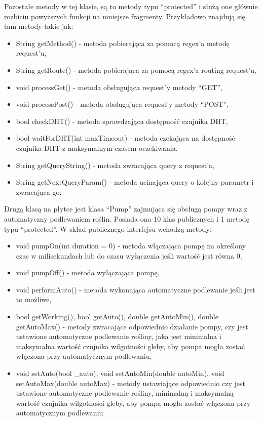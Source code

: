 \documentclass[a4paper,twoside,12pt]{book}
\begin{document}
Pozostałe metody w tej klasie, są to metody typu ``protected'' i służą one głównie rozbiciu powyższych funkcji na mniejsze fragmenty. Przykładowo znajdują się tam metody takie jak:

\begin{itemize}
   \item String getMethod() - metoda pobierająca za pomocą regex'a metodę request'u,
   \item String getRoute() - metoda pobierająca za pomocą regex'a routing request'u,
   \item void processGet() - metoda obsługująca request'y metody ``GET'',
   \item void processPost() - metoda obsługująca request'y metody ``POST'',
   \item bool checkDHT() - metoda sprawdzająca dostępność czujnika DHT,
   \item bool waitForDHT(int maxTimeout) - metoda czekająca na dostępność czujnika DHT z maksymalnym czasem oczekiwania.
   \item String getQueryString() - metoda zwracająca query z request'a,
   \item String getNextQueryParam() - metoda ucinająca query o kolejny parametr i zwracająca go.
\end{itemize}

Drugą klasą na płytce jest klasa ``Pump'' zajmująca się obsługą pompy wraz z automatyczny podlewaniem roślin. Posiada ona 10 klas publicznych i 1 metodę typu ``protected''. W skład publicznego interfejsu wchodzą metody:

\begin{itemize}
   \item void pumpOn(int duration = 0) - metoda włączająca pompę na określony czas w milisekundach lub do czasu wyłączenia jeśli wartość jest równa 0,
   \item void pumpOff() - metoda wyłączająca pompę,
   \item void performAuto() - metoda wykonująca automatyczne podlewanie jeśli jest to możliwe,
   \item bool getWorking(), bool getAuto(), double getAutoMin(), double getAutoMax() - metody zwracające odpowiednio działanie pompy, czy jest ustawione automatyczne podlewanie rośliny, jaka jest minimalna i maksymalna wartość czujnika wilgotności gleby, aby pompa mogła zostać włączona przy automatycznym podlewaniu,
   \item void setAuto(bool \_auto), void setAutoMin(double autoMin), void setAutoMax(double autoMax) - metody ustawiające odpowiednio czy jest ustawione automatyczne podlewanie rośliny, minimalną i maksymalną wartość czujnika wilgotności gleby, aby pompa mogła zostać włączona przy automatycznym podlewaniu.
\end{itemize}
\end{document}
